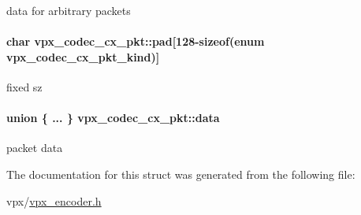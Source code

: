 data for arbitrary packets \hypertarget{structvpx__codec__cx__pkt_a49a0ba012fdabd49bff8069dfacf6ced}{
\paragraph[{pad}]{\setlength{\rightskip}{0pt plus 5cm}char {\bf vpx\-\_\-codec\-\_\-cx\-\_\-pkt\-::pad}\mbox{[}128-\/sizeof(enum {\bf vpx\-\_\-codec\-\_\-cx\-\_\-pkt\-\_\-kind})\mbox{]}}}\label{structvpx__codec__cx__pkt_a49a0ba012fdabd49bff8069dfacf6ced}
fixed sz \hypertarget{structvpx__codec__cx__pkt_a7f97b060a23b7e89fe5b885c0074f696}{
\paragraph[{data}]{\setlength{\rightskip}{0pt plus 5cm}union \{ ... \}   {\bf vpx\-\_\-codec\-\_\-cx\-\_\-pkt\-::data}}}\label{structvpx__codec__cx__pkt_a7f97b060a23b7e89fe5b885c0074f696}
packet data 

\-The documentation for this struct was generated from the following file\-:\begin{DoxyCompactItemize}
\item 
vpx/\hyperlink{vpx__encoder_8h}{vpx\-\_\-encoder.\-h}\end{DoxyCompactItemize}
